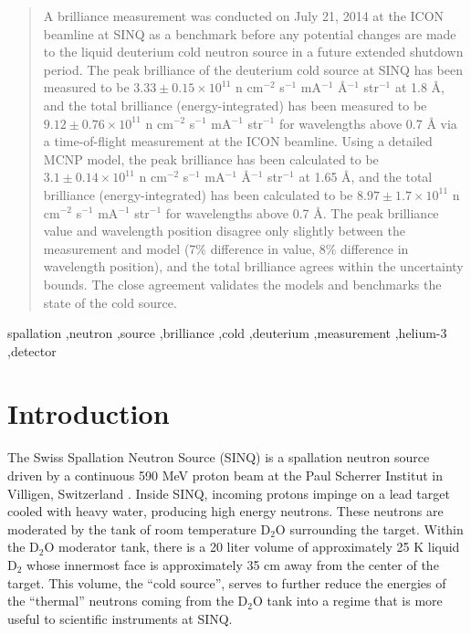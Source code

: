 \documentclass[5p,12pt]{elsarticle}
\begin{document}
\begin{frontmatter}
\begin{abstract}
A brilliance measurement was conducted on July 21, 2014 at the ICON beamline at SINQ as a benchmark before any potential changes are made to the liquid deuterium cold neutron source in a future extended shutdown period.  The peak brilliance of the deuterium cold source at SINQ has been measured to be $3.33 \pm 0.15\times10^{11}$ n cm$^{-2}$ s$^{-1}$ mA$^{-1}$ \AA$^{-1}$ str$^{-1}$ at 1.8 {\AA}, and the total brilliance (energy-integrated) has been measured to be  $9.12 \pm 0.76\times10^{11}$  n cm$^{-2}$ s$^{-1}$ mA$^{-1}$ str$^{-1}$ for wavelengths above 0.7 {\AA} via a time-of-flight measurement at the ICON beamline.  Using a detailed MCNP model, the peak brilliance has been calculated to be $3.1 \pm 0.14\times10^{11}$ n cm$^{-2}$ s$^{-1}$ mA$^{-1}$ \AA$^{-1}$ str$^{-1}$ at 1.65 {\AA}, and the total brilliance (energy-integrated) has been calculated to be  $8.97 \pm 1.7\times10^{11}$  n cm$^{-2}$ s$^{-1}$ mA$^{-1}$ str$^{-1}$ for wavelengths above 0.7 {\AA}.  The peak brilliance value and wavelength position disagree only slightly between the measurement and model (7\% difference in value, 8\% difference in wavelength position), and the total brilliance agrees within the uncertainty bounds.  The close agreement validates the models and benchmarks the state of the cold source.  

\end{abstract}

\begin{keyword}
spallation \sep neutron \sep source \sep brilliance \sep cold \sep deuterium \sep measurement \sep helium-3 \sep detector


\end{keyword}


\end{frontmatter}



\section{Introduction}
\label{sec:intro}

The Swiss Spallation Neutron Source (SINQ) is a spallation neutron source driven by a continuous 590 MeV proton beam at the Paul Scherrer Institut in Villigen, Switzerland \cite{hipa}.  Inside SINQ, incoming protons impinge on a lead target cooled with heavy water, producing high energy neutrons.  These neutrons are moderated by the tank of room temperature D$_2$O surrounding the target.  Within the D$_2$O moderator tank, there is a 20 liter volume of approximately 25 K liquid D$_2$ whose innermost face is approximately 35 cm away from the center of the target.  This volume, the ``cold source'', serves to further reduce the energies of the ``thermal'' neutrons coming from the D$_2$O tank into a regime that is more useful to scientific instruments at SINQ.  
\end{document}
